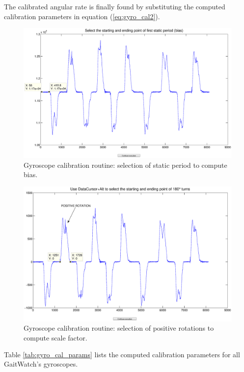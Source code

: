 The calibrated angular rate is finally found by substituting the computed calibration parameters in equation (\ref{eq:gyro_cal2}).

\begin{figure}[H]
\centering
\includegraphics[width=1\textwidth]{figures/gyro_cal_routine_bias.eps}
\caption{Gyroscope calibration routine: selection of static period to compute bias.}
\label{fig:gyro_cal_routine_bias}
\end{figure}

\begin{figure}[H]
\centering
\includegraphics[width=1\textwidth]{figures/gyro_cal_routine_sf.eps}
\caption{Gyroscope calibration routine: selection of positive rotations to compute scale factor.}
\label{fig:gyro_cal_routine_sf}
\end{figure}

Table \ref{tab:gyro_cal_params} lists the computed calibration parameters for all GaitWatch's gyroscopes.

